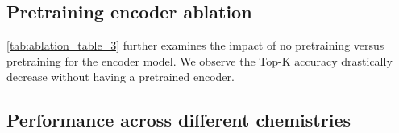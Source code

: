 \subsection{Pretraining encoder ablation} 
\cref{tab:ablation_table_3} further examines the impact of no pretraining versus pretraining for the encoder model. We observe the Top-K accuracy drastically decrease without having a pretrained encoder.

\begin{table}[H]%
\centering
\caption{\textbf{Ablation pretraining.} Investigating the impact of pretraining for the encoder with the Top-K accuracy.}
\label{tab:ablation_table_3}
\small %
\normalsize %
\end{table}




\subsection{Performance across different chemistries}

